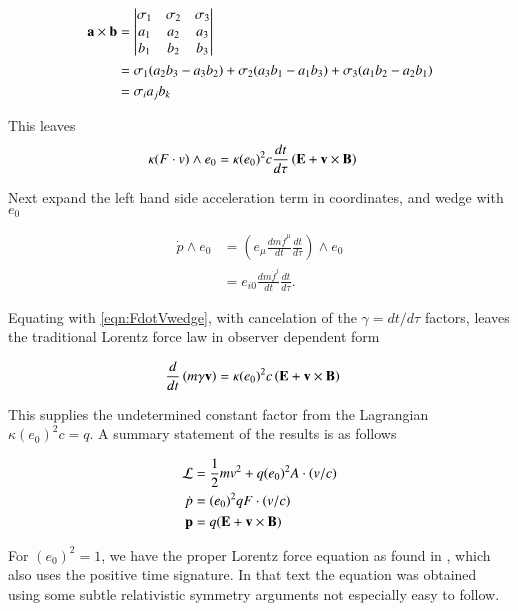 \documentclass{article}
\newcommand{\LL}[0]{\mathcal{L}}
\newcommand{\pdot}[0]{\dot{p}}
\newcommand{\fdot}[0]{\dot{f}}
\begin{document}
\begin{align*}
\mathbf{a} \times \mathbf{b} &= 
\begin{vmatrix}
\sigma_1 & \sigma_2 & \sigma_3 \\
a_1 & a_2 & a_3 \\
b_1 & b_2 & b_3 \\
\end{vmatrix} \\
&=
  \sigma_1 (a_2 b_3 - a_3 b_2)
+ \sigma_2 (a_3 b_1 - a_1 b_3)
+ \sigma_3 (a_1 b_2 - a_2 b_1) \\
&=
  \sigma_i a_j b_k
\end{align*}

This leaves
\begin{align}\label{eqn:FdotVwedge}
\kappa (F \cdot v) \wedge e_0
&= \kappa (e_0)^2 c \frac{dt}{d\tau} \left( \mathbf{E} + \mathbf{v} \times \mathbf{B} \right)
\end{align}

Next expand the left hand side acceleration term in coordinates, and wedge with $e_0$

\begin{align*}
\pdot \wedge e_0 
&= \left(e_\mu \frac{d m \fdot^\mu}{dt}\frac{dt}{d\tau} \right) \wedge e_0 \\
&= e_{i0} \frac{d m \fdot^i}{dt} \frac{dt}{d\tau}.
\end{align*}

Equating with \ref{eqn:FdotVwedge}, with cancelation of the $\gamma = dt/d\tau$ factors, leaves the traditional Lorentz force law in observer dependent form

\begin{align*}
\frac{d}{dt}\left( m \gamma \mathbf{v} \right) &= \kappa (e_0)^2 c \left( \mathbf{E} + \mathbf{v} \times \mathbf{B} \right)
\end{align*}

This supplies the undetermined constant factor from the Lagrangian $\kappa (e_0)^2 c = q$.  A summary statement of the results is as follows

\begin{align}
\LL &= \inv{2} m v^2 + q (e_0)^2 A \cdot (v/c) \\
\pdot &= (e_0)^2 q F \cdot (v/c) \\
\Bp &= q (\BE + \Bv \cross \BB)
\end{align}

For $(e_0)^2 = 1$, we have the proper Lorentz force equation as found in
\cite{doran2003gap}, which also uses the positive time signature.  In that text the equation was obtained using some subtle relativistic symmetry arguments not especially easy to follow.
\end{document}
